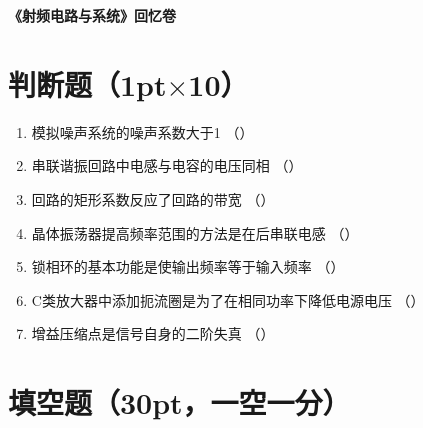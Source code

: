 \documentclass[12pt,a4paper]{ctexart}
\begin{document}
\begin{center}
    \LARGE\textbf{《射频电路与系统》回忆卷}
\end{center}

\vspace{0.5cm}

\section{判断题（1pt$\times$10）}

\begin{enumerate}[label=\arabic*、,leftmargin=2em]
    \item 模拟噪声系统的噪声系数大于1 \hfill （\quad）
    
    \item 串联谐振回路中电感与电容的电压同相 \hfill （\quad）
    
    \item 回路的矩形系数反应了回路的带宽 \hfill （\quad）
    
    \item 晶体振荡器提高频率范围的方法是在后串联电感 \hfill （\quad）
    
    \item 锁相环的基本功能是使输出频率等于输入频率 \hfill （\quad）
    
    \item C类放大器中添加扼流圈是为了在相同功率下降低电源电压 \hfill （\quad）
    
    \item 增益压缩点是信号自身的二阶失真 \hfill （\quad）
\end{enumerate}

\vspace{1cm}

\section{填空题（30pt，一空一分）}
\end{document}

